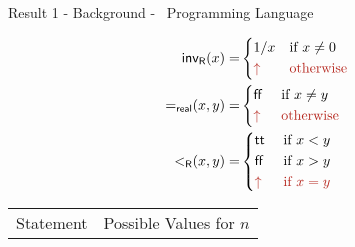 \begin{frame}{Result 1 - Background - \WhileCC\ Programming Language}
\begin{minipage}[t]{0.34\linewidth}
    \end{minipage}
    \begin{minipage}[t]{0.30\linewidth}
        \pause
        \begin{center}
             \vspace{-1.8em}
             \textbf{\color{Blue}{Semantics} }
         \end{center}            
            \begin{align*}
            \realInv(x) = &
                \begin{cases*}
                    1/x & if $x \neq 0$\\
                    {\color{BrickRed}\uparrow} & {\color{BrickRed}otherwise}
                \end{cases*}\\
            \mathsf{=_{real}}(x,y) = &
                \begin{cases*}
                    \false\ & if $x \neq y$\\
                    {\color{BrickRed} \uparrow\ }& {\color{BrickRed} otherwise}
                \end{cases*}\\
            \realLess(x,y) = &
                \begin{cases*}
                    \true\ & if $x<y$\\
                    \false\ & if $x>y$\\
                    {\color{BrickRed}\uparrow} & {\color{BrickRed} if $x=y$}\\
                \end{cases*}
            \end{align*}
        \setlength{\fboxsep}{0pt}
        \pause
    \end{minipage}
    \pause
    \begin{minipage}[t]{0.67\linewidth}
        \vspace{-1.3em}
        \begin{table}[]
            \centering
            \begin{tabular}{|c|c|}
                \hline
                Statement & Possible Values for $n$ \\

\end{tabular}
\end{table}
\end{minipage}
\end{frame}
